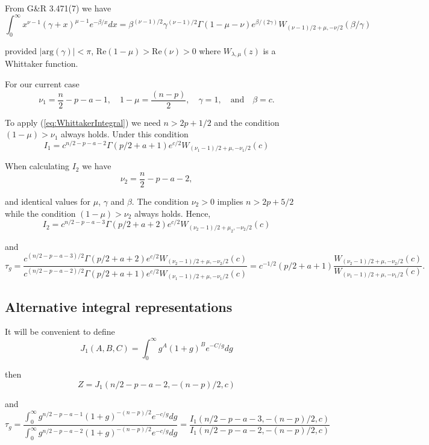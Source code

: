 \documentclass{article}
\def\ds{\displaystyle}
\begin{document}
\noindent From G\&R 3.471(7) we have
\begin{equation}\label{eq:WhittakerIntegral}
\int_0^\infty x^{\nu - 1} (\gamma + x)^{\mu - 1} e^{-\beta/x} dx 
= \beta^{(\nu-1)/2}
\gamma^{(\nu-1)/2}
\Gamma(1 - \mu - \nu)
e^{\beta/(2\gamma)}W_{(\nu-1)/2 + \mu,-\nu/2}(\beta/\gamma)
\end{equation}

\noindent provided $|\mbox{arg}(\gamma)|<\pi$, $\mbox{Re}(1 - \mu)>\mbox{Re}(\nu)>0$
where $W_{\lambda,\mu}(z)$ is a Whittaker function.

\medskip 
\noindent 
For our current case
$$
\nu_1 = \frac{n}{2} - p - a - 1, 
\quad 
1 - \mu = \frac{(n-p)}{2},
\quad 
\gamma = 1,
\quad 
\mbox{and}
\quad 
\beta = c.
$$

\noindent To apply (\ref{eq:WhittakerIntegral}) we need $n > 2p + 1/2$
and  the condition $(1 - \mu)>\nu_1$ always holds.
Under this condition
$$
I_1 = c^{n/2 - p - a - 2}
\Gamma(p/2  + a + 1)
e^{c/2}
W_{(\nu_1-1)/2 + \mu,-\nu_1/2}(c)
$$

\medskip 
\noindent 
When calculating $I_2$ we have
$$
\nu_2 = \frac{n}{2} - p - a - 2, 
$$

\noindent and identical values for $\mu$, $\gamma$ and $\beta$.
The condition $\nu_2>0$ implies
$n >  2p + 5/2$ while the condition $(1 - \mu)>\nu_2$ always holds.
Hence,
$$
I_2 = c^{n/2 - p - a - 3}
\Gamma(p/2  + a + 2)
e^{c/2}
W_{(\nu_2-1)/2 + \mu_2,-\nu_2/2}(c)
$$

\noindent and
$$
\ds \tau_g
= \frac{\ds c^{(n/2 - p - a - 3)/2}
	\Gamma(p/2  + a + 2)
	e^{c/2}
	W_{(\nu_2-1)/2 + \mu,-\nu_2/2}(c)}{
	\ds c^{(n/2 - p - a - 2)/2}
	\Gamma(p/2  + a + 1)
	e^{c/2}
	W_{(\nu_1-1)/2 + \mu,-\nu_1/2}(c)}
=  c^{-1/2} (p/2  + a + 1)\frac{\ds 
	W_{(\nu_2-1)/2 + \mu,-\nu_2/2}(c)}{
	W_{(\nu_1-1)/2 + \mu,-\nu_1/2}(c)}.
$$

\subsection{Alternative integral representations}

\noindent It will be convenient to define
$$
\ds J_1(A,B,C) = \int_0^\infty g^A(1 + g)^{B}e^{-C/g} dg
$$

\noindent then
$$
Z = J_1(n/2 - p - a - 2,-(n-p)/2,c)
$$

\noindent and
$$
\tau_g = \frac{\ds \int_0^\infty g^{n/2 - p - a - 1}(1 + g)^{-(n-p)/2}e^{-c/g} dg}{
	\ds \int_0^\infty g^{n/2 - p - a - 2}(1 + g)^{-(n-p)/2}e^{-c/g} dg} 
= \frac{I_1(n/2 - p - a - 3,-(n-p)/2,c)}{I_1(n/2 - p - a - 2,-(n-p)/2,c)}
$$
\end{document}
